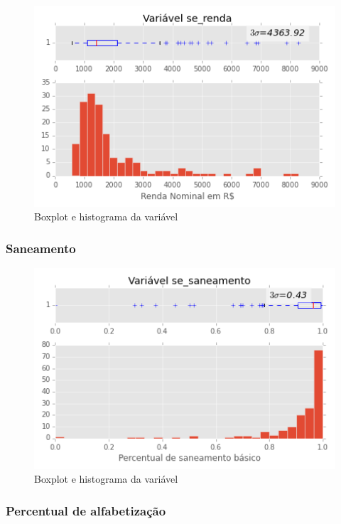 \begin{figure}[H]
	\centering
	\includegraphics[width=0.8\linewidth]{img/var_se_renda_boxhist}
	\caption{Boxplot e histograma da variável }
	\label{fig:var_se_renda_boxhist}
\end{figure} 

\subsubsection{Saneamento}

\begin{figure}[H]
	\centering
	\includegraphics[width=0.8\linewidth]{img/var_se_saneamento_boxhist}
	\caption{Boxplot e histograma da variável }
	\label{fig:var_se_saneamento_boxhist}
\end{figure} 

\subsubsection{Percentual de alfabetização}

